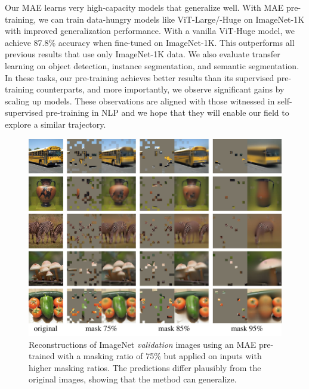 \documentclass[10pt,twocolumn,letterpaper]{article}
\begin{document}
Our MAE learns very high-capacity models that generalize well. With MAE pre-training, we can train data-hungry models like ViT-Large/-Huge \cite{Dosovitskiy2021} on ImageNet-1K with improved generalization performance. With a vanilla \mbox{ViT-Huge} model, we achieve 87.8\% accuracy when fine-tuned on ImageNet-1K. This outperforms all previous results that use only ImageNet-1K data. We also evaluate transfer learning on object detection, instance segmentation, and semantic segmentation. In these tasks, our pre-training achieves better results than its supervised pre-training counterparts, and more importantly, we observe significant gains by scaling up models. These observations are aligned with those witnessed in self-supervised pre-training in NLP \cite{Devlin2019, Radford2018, Radford2019, Brown2020} and we hope that they will enable our field to explore a similar trajectory.

\begin{figure}[t]\centering
\includegraphics[width=0.995\linewidth]{fig/mask_generalization}\vspace{-.7em}
\caption{Reconstructions of ImageNet \textit{validation} images using an MAE pre-trained with a masking ratio of 75\% but applied on inputs with higher masking ratios. The predictions differ plausibly from the original images, showing that the method can generalize. }
\label{fig:mask_generalization}
\end{figure}
\end{document}
